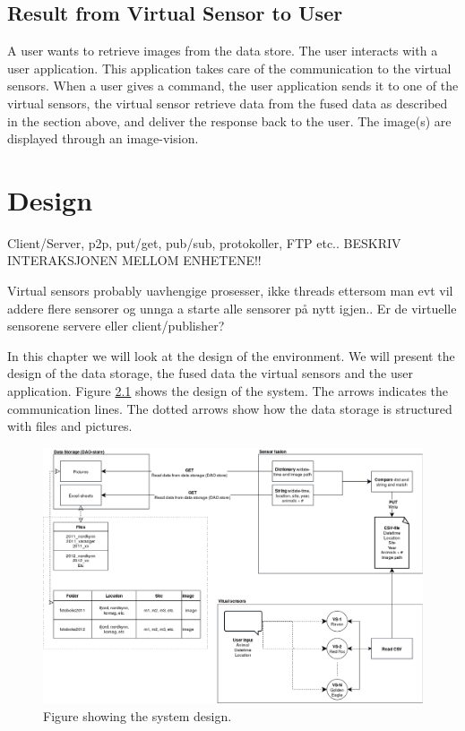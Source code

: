 \documentclass[USenglish]{uit-thesis}
\begin{document}
\section{Result from Virtual Sensor to User}
A user wants to retrieve images from the data store.
The user interacts with a user application. This application takes care of the communication to the virtual sensors. When a user gives a command, the user application sends it to one of the virtual sensors, the virtual sensor retrieve data from the fused data as described in the section above, and deliver the response back to the user. The image(s) are displayed through an image-vision.


\chapter{Design}
Client/Server, p2p, put/get, pub/sub, protokoller, FTP etc..
BESKRIV INTERAKSJONEN MELLOM ENHETENE!!

Virtual sensors probably uavhengige prosesser, ikke threads ettersom man evt vil addere flere sensorer og unnga a starte alle sensorer på nytt igjen..
Er de virtuelle sensorene servere eller client/publisher?

In this chapter we will look at the design of the environment. We will present the design of the data storage, the fused data the virtual sensors and the user application. Figure \ref{fig:design} shows the design of the system. The arrows indicates the communication lines. The dotted arrows show how the data storage is structured with files and pictures.


\begin{figure}
\centering
\includegraphics[width=\textwidth]{Design.png}
\caption{Figure showing the system design.}
\label{fig:design}
\end{figure}
\end{document}
